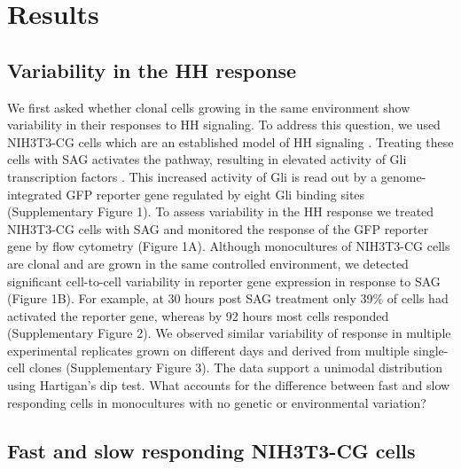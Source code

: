 \section{Results}

\subsection{Variability in the HH response}


We first asked whether clonal cells growing in the same environment show variability in their responses to HH signaling. To address this question, we used NIH3T3-CG cells which are an established model of HH signaling \cite{Pusapati2018-gs,Kinnebrew2019-gt}. Treating these cells with SAG activates the pathway, resulting in elevated activity of Gli transcription factors \cite{Briscoe2013-ze,Lee2016-bf,Kong2019-wo}. This increased activity of Gli is read out by a genome-integrated GFP reporter gene regulated by eight Gli binding sites (Supplementary Figure 1). To assess variability in the HH response we treated NIH3T3-CG cells with SAG and monitored the response of the GFP reporter gene by flow cytometry (Figure 1A). Although monocultures of NIH3T3-CG cells are clonal and are grown in the same controlled environment, we detected significant cell-to-cell variability in reporter gene expression in response to SAG (Figure 1B). For example, at 30 hours post SAG treatment only 39\% of cells had activated the reporter gene, whereas by 92 hours most cells responded (Supplementary Figure 2). We observed similar variability of response in multiple experimental replicates grown on different days and derived from multiple single-cell clones (Supplementary Figure 3).  The data support a unimodal distribution using Hartigan’s dip test\cite{Hartigan1985-zq}. What accounts for the difference between fast and slow responding cells in monocultures with no genetic or environmental variation?

\subsection{Fast and slow responding NIH3T3-CG cells}

